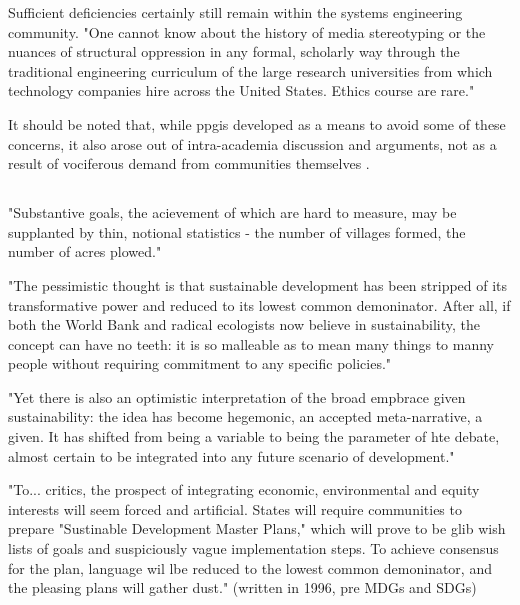 Sufficient deficiencies certainly still remain within the systems engineering community. "One cannot know about the history of media stereotyping or the nuances of structural oppression in any formal, scholarly way through the traditional engineering curriculum of the large research universities from which technology companies hire across the United States. Ethics course are rare." \cite{nobleAlgorithmsOppressionHow2018}

It should be noted that, while \ac{ppgis} developed as a means to avoid some of these concerns, it also arose out of intra-academia discussion and arguments, not as a result of vociferous demand from communities themselves \cite{weinerParticipatoryGeographicInformation2007, sieberPublicParticipationGeographic2006}. 

\subsection{} \label{sec:sdg_critique}

"Substantive goals, the acievement of which are hard to measure, may be supplanted by thin, notional statistics - the number of villages formed, the number of acres plowed." \cite{scottSeeingStateHow2020}


"The pessimistic thought is that sustainable development has been stripped of its transformative power and reduced to its lowest common demoninator. After all, if both the World Bank and radical ecologists now believe in sustainability, the concept can have no teeth: it is so malleable as to mean many things to manny people without requiring commitment to any specific policies." \cite{campbellGreenCitiesGrowing2016}

"Yet there is also an optimistic interpretation of the broad empbrace given sustainability: the idea has become hegemonic, an accepted meta-narrative, a given. It has shifted from being a variable to being the parameter of hte debate, almost certain to be integrated into any future scenario of development." \cite{campbellGreenCitiesGrowing2016}

"To... critics, the prospect of integrating economic, environmental and equity interests will seem forced and artificial. States will require communities to prepare "Sustinable Development Master Plans," which will prove to be glib wish lists of goals and suspiciously vague implementation steps. To achieve consensus for the plan, language wil lbe reduced to the lowest common demoninator, and the pleasing plans will gather dust." (written in 1996, pre MDGs and SDGs) \cite{campbellGreenCitiesGrowing2016}

